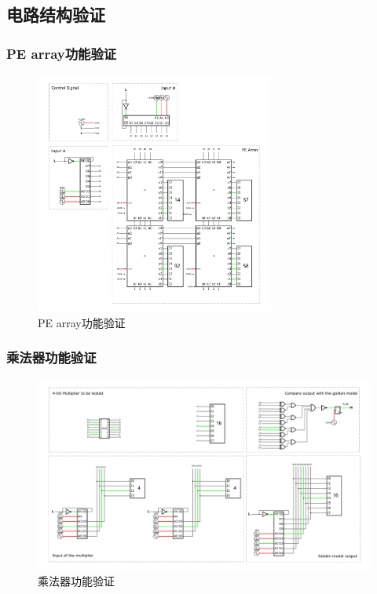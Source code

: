 \documentclass{article}
\begin{document}
\subsection{电路结构验证}

\subsubsection{PE array功能验证}

\begin{figure}[H]
    \centering
    \includegraphics[width=0.7\textwidth]{PE验证_1.pdf}
    \caption{PE array功能验证}
\end{figure}

\subsubsection{乘法器功能验证}

\begin{figure}[H]
    \centering
    \includegraphics[width=1\textwidth]{乘法器验证.pdf}
    \caption{乘法器功能验证}
\end{figure}
\end{document}
